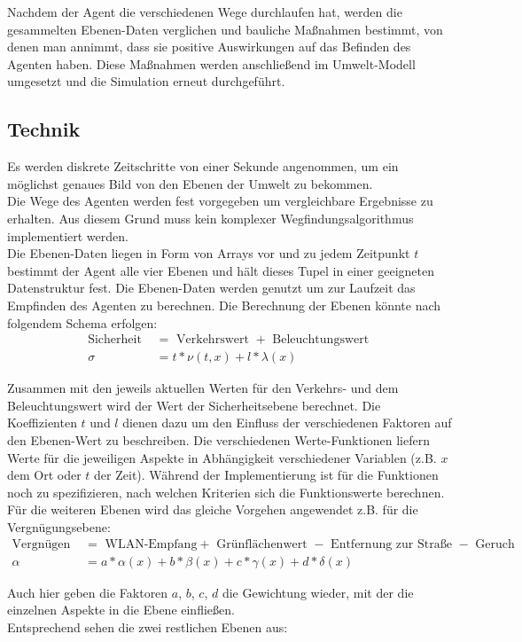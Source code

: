 \documentclass[10pt]{scrartcl}
\begin{document}
Nachdem der Agent die verschiedenen Wege durchlaufen hat, werden die gesammelten Ebenen-Daten verglichen und bauliche Maßnahmen bestimmt, von denen man annimmt, dass sie positive Auswirkungen auf das Befinden des Agenten haben. Diese Maßnahmen werden anschließend im Umwelt-Modell umgesetzt und die Simulation erneut durchgeführt.

\subsection{Technik}
Es werden diskrete Zeitschritte von einer Sekunde angenommen, um ein möglichst genaues Bild von den Ebenen der Umwelt zu bekommen.\\
Die Wege des Agenten werden fest vorgegeben um vergleichbare Ergebnisse zu erhalten. Aus diesem Grund muss kein komplexer Wegfindungsalgorithmus implementiert werden.\\
Die Ebenen-Daten liegen in Form von Arrays vor und zu jedem Zeitpunkt $t$ bestimmt der Agent alle vier Ebenen und hält dieses Tupel in einer geeigneten Datenstruktur fest. Die Ebenen-Daten werden genutzt um zur Laufzeit das Empfinden des Agenten zu berechnen.
Die Berechnung der Ebenen könnte nach folgendem Schema erfolgen:
\begin{align}
	\text{Sicherheit } &= \text{ Verkehrswert } + \text{ Beleuchtungswert }\\
	\sigma &= t * \nu(t,x) + l * \lambda(x)
\end{align}

Zusammen mit den jeweils aktuellen Werten für den Verkehrs- und dem Beleuchtungswert wird der Wert der Sicherheitsebene berechnet.
Die Koeffizienten $t$ und $l$ dienen dazu um den Einfluss der verschiedenen Faktoren auf den Ebenen-Wert zu beschreiben.
Die verschiedenen Werte-Funktionen liefern Werte für die jeweiligen Aspekte in Abhängigkeit verschiedener Variablen (z.B. $x$ dem Ort oder $t$ der Zeit).
Während der Implementierung ist für die Funktionen noch zu spezifizieren, nach welchen Kriterien sich die Funktionswerte berechnen.
Für die weiteren Ebenen wird das gleiche Vorgehen angewendet z.B. für die Vergnügungsebene:
\begin{align}
	\text{Vergnügen } &= \text{ WLAN-Empfang} + \text{ Grünflächenwert } - \text{ Entfernung zur Straße } - \text{ Geruch }\\
	\alpha &= a * \alpha(x) + b * \beta(x) + c * \gamma(x) + d * \delta(x)\
\end{align}

Auch hier geben die Faktoren $a$, $b$, $c$, $d$ die Gewichtung wieder, mit der die einzelnen Aspekte in die Ebene einfließen.\\
Entsprechend sehen die zwei restlichen Ebenen aus:
\end{document}
